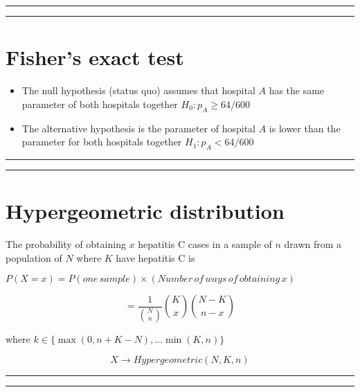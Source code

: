 \documentclass[
]{book}
\begin{document}
\begin{center}\rule{0.5\linewidth}{0.5pt}\end{center}

\begin{center}\rule{0.5\linewidth}{0.5pt}\end{center}

\hypertarget{fishers-exact-test-1}{%
\section{Fisher's exact test}\label{fishers-exact-test-1}}

\begin{itemize}
\item
  The null hypothesis (status quo) assumes that hospital \(A\) has the same parameter of both hospitals together \(H_0: p_A \geq 64/600\)
\item
  The alternative hypothesis is the parameter of hospital \(A\) is lower than the parameter for both hospitals together \(H_1: p_A < 64/600\)
\end{itemize}

\begin{center}\rule{0.5\linewidth}{0.5pt}\end{center}

\begin{center}\rule{0.5\linewidth}{0.5pt}\end{center}

\hypertarget{hypergeometric-distribution-3}{%
\section{Hypergeometric distribution}\label{hypergeometric-distribution-3}}

The probability of obtaining \(x\) hepatitis C cases in a sample of \(n\) drawn from a population of \(N\) where \(K\) have hepatitis C is

\(P(X=x)=P(one\,sample) \times (Number\, of\, ways\, of\, obtaining\, x)\)

\[=\frac{1}{\binom N n}\binom K x \binom {N-K} {n-x}\]

where \(k \in \{\max(0, n+K-N), ... \min(K, n) \}\)

\[X \rightarrow Hypergeometric(N,K,n)\]

\begin{center}\rule{0.5\linewidth}{0.5pt}\end{center}

\begin{center}\rule{0.5\linewidth}{0.5pt}\end{center}
\end{document}
